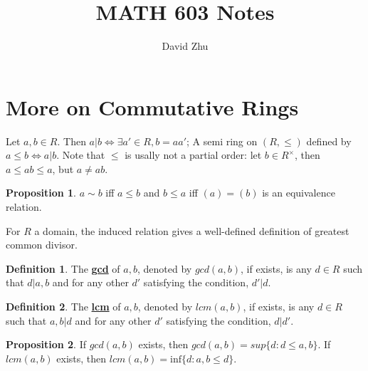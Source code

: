 \documentclass{article}
\title{MATH 603 Notes}
\author{David Zhu}
\theoremstyle{definition}
\theoremstyle{definition}
\theoremstyle{definition}
\newtheorem{proposition}{Proposition}[section]
\theoremstyle{definition}
\theoremstyle{definition}
\newtheorem{definition}{Definition}[section]
\theoremstyle{definition}
\theoremstyle{definition}
\begin{document}
\maketitle

\section{More on Commutative Rings}
Let $a,b\in R$. Then $a|b \iff \exists a'\in R, b=aa'$;
A semi ring on $(R,\leq)$ defined by $a\leq b \iff a|b$. Note that $\leq $ is usally not a partial order: let $b\in R^{\times}$, then $a\leq ab\leq a$, but $a\neq ab$.


\begin{tcolorbox}[colback=blue!5!white,colframe=blue!30!white]
\begin{proposition}
    $a\sim b$ iff $a\leq b$ and $b\leq a$ iff $(a)=(b)$ is an equivalence relation.
\end{proposition}
\end{tcolorbox}

For $R$ a domain, the induced relation gives a well-defined definition of greatest common divisor.
\begin{tcolorbox}[colback=red!5!white,colframe=red!30!white]
    \begin{definition}
        The \underline{\textbf{gcd}} of $a,b$, denoted by $gcd(a,b)$, if exists, is any $d\in R$ such that $d|a,b$ and for any other $d'$ satisfying the condition, $d'|d$.
    \end{definition}    
\end{tcolorbox}


\begin{tcolorbox}[colback=purple!5!white,colframe=purple!75!black]
\begin{definition}
    The \underline{\textbf{lcm}} of $a,b$, denoted by $lcm(a,b)$, if exists, is any  $d\in R$ such that $a,b|d$ and for any other $d'$ satisfying the condition, $d|d'$.
\end{definition}
\end{tcolorbox}


\begin{tcolorbox}[colback=blue!5!white,colframe=blue!30!white]
\begin{proposition}
    If $gcd(a,b)$ exists, then $gcd(a,b)=sup \{ d:d\leq a,b \}$.  If $lcm(a,b)$ exists, then $lcm(a,b)=\textrm{inf} \{ d :a,b\leq d \}$. 
\end{proposition}
\end{tcolorbox}
\end{document}
